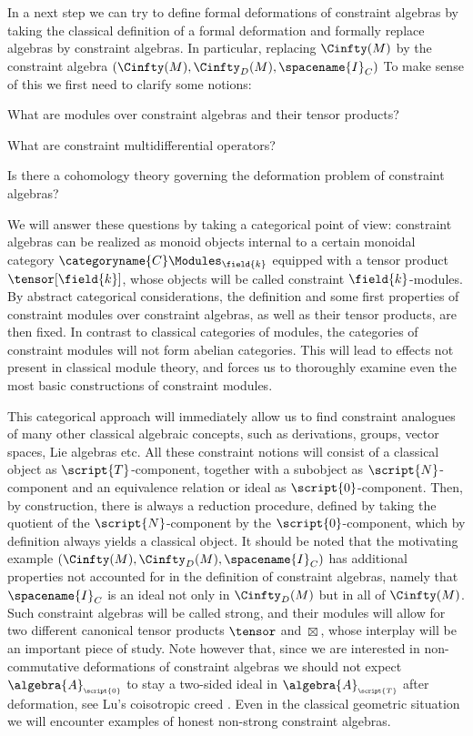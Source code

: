 \documentclass{memoir}
\newcommand{\Total}{{\scriptscriptstyle\script{T}}}
\newcommand{\Null}{{\scriptscriptstyle\script{0}}}
\newcommand{\TOTAL}{\script{T}}
\newcommand{\WOBS}{\script{N}}
\newcommand{\NULL}{\script{0}}
\newcommand{\strtensor}[1][{}]{\mathbin{\boxtimes_{\scriptscriptstyle{#1}}}}
\newcommand{\vanishing}{\spacename{I}}
\newcommand{\Con}{\categoryname{C}}
\newcommand{\ConMod}{\Con\Modules}
\begin{document}
In a next step we can try to define formal deformations of constraint algebras by taking the classical definition of a formal deformation and formally replace algebras by constraint algebras.
In particular, replacing $\Cinfty(M)$ by the constraint algebra $(\Cinfty(M), \Cinfty_D(M), \vanishing_C)$
To make sense of this we first need to clarify some notions:
\begin{cptitem}
	\item What are modules over constraint algebras and their tensor products?
	\item What are constraint multidifferential operators?
	\item Is there a cohomology theory governing the deformation problem of constraint algebras?
\end{cptitem}
We will answer these questions by taking a categorical point of view:
constraint algebras can be realized as monoid objects internal to a certain monoidal category 
$\ConMod_\field{k}$ equipped with a tensor product $\tensor[\field{k}]$, whose objects will be called
constraint $\field{k}$-modules.
By abstract categorical considerations, the definition and some first properties
of constraint modules over constraint algebras, as well as their tensor products, are then fixed.
In contrast to classical categories of modules, the categories of constraint modules will not form abelian categories.
This will lead to effects not present in classical module theory, and forces us to thoroughly examine even the most basic constructions of constraint modules.

This categorical approach will immediately allow us to find constraint analogues of many other classical algebraic concepts, such as derivations, groups, vector spaces, Lie algebras etc.
All these constraint notions will consist of a classical object as $\TOTAL$-component, together with a subobject as
$\WOBS$-component and an equivalence relation or ideal as $\NULL$-component.
Then, by construction, there is always a reduction procedure, defined by taking the quotient of the $\WOBS$-component by the $\NULL$-component, which by definition always yields a classical object.
It should be noted that the motivating example $(\Cinfty(M), \Cinfty_D(M),\vanishing_C)$
has additional properties not accounted for in the definition of constraint algebras, namely that
$\vanishing_C$ is an ideal not only in $\Cinfty_D(M)$ but in all of $\Cinfty(M)$.
Such constraint algebras will be called strong, and their modules will allow for two different canonical tensor products
$\tensor$ and $\strtensor$, whose interplay will be an important piece of study.
Note however that, since we are interested in non-commutative deformations of constraint algebras we should not expect
$\algebra{A}_\Null$ to stay a two-sided ideal in $\algebra{A}_\Total$ after deformation, see Lu's coisotropic creed \cite{lu:1993a}.
Even in the classical geometric situation we will encounter examples of honest non-strong constraint algebras.
\end{document}
